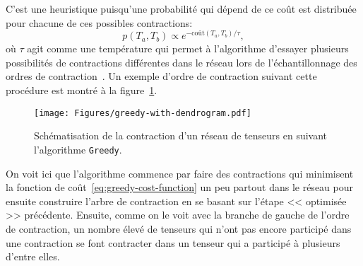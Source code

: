 C'est une heuristique puisqu'une probabilité qui dépend de ce coût est distribuée pour chacune de ces possibles contractions:
\begin{equation}
    p(T_a, T_b) \propto e^{-\mathrm{coût}(T_a, T_b)/\tau},
\end{equation}
où $\tau$ agit comme une température qui permet à l'algorithme d'essayer plusieurs possibilités de contractions différentes dans le réseau lors de l'échantillonnage des ordres de contraction~\cite{gray_hyper-optimized_2021}.
Un exemple d'ordre de contraction suivant cette procédure est montré à la figure~\ref{fig:greedy-with-dendrogram}.
\begin{figure}[h]
    \centering
    \texttt{[image: Figures/greedy-with-dendrogram.pdf]}
    \caption[Schématisation de la contraction d'un réseau de tenseurs (\texttt{Greedy}).]{Schématisation de la contraction d'un réseau de tenseurs en suivant l'algorithme \texttt{Greedy}.}
    \label{fig:greedy-with-dendrogram}
\end{figure}
On voit ici que l'algorithme commence par faire des contractions qui minimisent la fonction de coût~\ref{eq:greedy-cost-function} un peu partout dans le réseau pour ensuite construire l'arbre de contraction en se basant sur l'étape << optimisée >> précédente.
Ensuite, comme on le voit avec la branche de gauche de l'ordre de contraction, un nombre élevé de tenseurs qui n'ont pas encore participé dans une contraction se font contracter dans un tenseur qui a participé à plusieurs d'entre elles.

